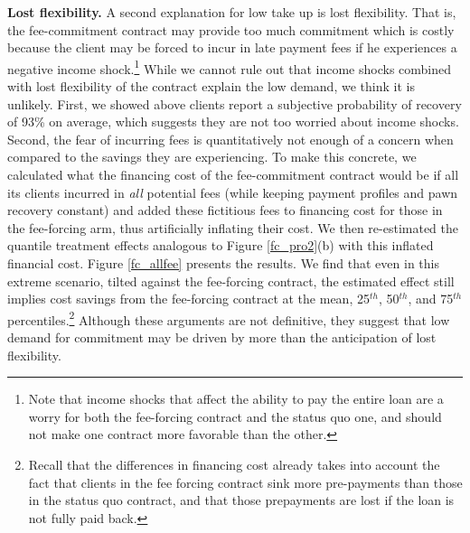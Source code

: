 \documentclass[oneside,11pt]{article}
\begin{document}
\vspace{.1in}
\noindent \textbf{Lost flexibility.} A second explanation for low take up is lost flexibility. That is, the fee-commitment contract may provide too much commitment which is costly because the client may be forced to incur in late payment fees if he experiences a negative income shock.\footnote{Note that income shocks that affect the ability to pay the entire loan are a worry for both the fee-forcing contract and the status quo one, and should not make one contract more favorable than the other.} While we cannot rule out that income shocks combined with lost flexibility of the contract explain the low demand, we think it is unlikely. First, we showed above clients report a subjective probability of recovery of 93\% on average, which suggests they are not too worried about income shocks. Second, the fear of incurring fees is quantitatively not enough of a concern when compared to the savings they are experiencing. %
To make this concrete, we calculated what the financing cost of the fee-commitment contract would be if all its clients incurred in \textit{all} potential fees (while keeping payment profiles and pawn recovery constant) and added these fictitious fees to financing cost for those in the fee-forcing arm, thus artificially inflating their cost. We then re-estimated the quantile treatment effects analogous to Figure \ref{fc_pro2}(b) with this inflated financial cost. %
Figure \ref{fc_allfee} presents the results. We find that even in this extreme scenario, tilted against the fee-forcing contract, the estimated effect still implies cost savings from the fee-forcing contract at the mean, 25$^{th}$, 50$^{th}$, and 75$^{th}$ percentiles.\footnote{Recall that the differences in financing cost already takes into account the fact that clients in the fee forcing contract sink more pre-payments than those in the status quo contract, and that those prepayments are lost if the loan is not fully paid back.}  Although these arguments are not definitive, they suggest that low demand for commitment may be driven by more than the anticipation of lost flexibility.
\end{document}
